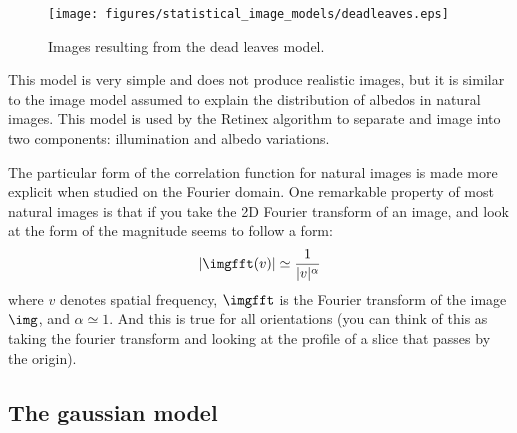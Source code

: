 \begin{figure}[htpb]
  \centerline{
    \texttt{[image: figures/statistical\_image\_models/deadleaves.eps]}
  }
  \caption{Images resulting from the dead leaves model.
  }
  \label{fig:deadleaves}
\end{figure}

This model is very simple and does not produce realistic images, but it is similar to the image model assumed to explain the distribution of albedos in natural images. This model is used by the Retinex algorithm to separate and image into two components: illumination and albedo variations. %

The particular form of the correlation function for natural images is made more explicit when studied on the Fourier domain. One remarkable property of most natural images is that if you take the 2D Fourier transform of an image, and look at the form of the magnitude seems to follow a form:
\begin{equation}
  | \imgfft(v) | \simeq \frac{1}{| v | ^ \alpha}
\end{equation}
where $v$ denotes spatial frequency, $\imgfft$ is the Fourier transform of the image $\img$, and $\alpha \simeq 1$. And this is true for all orientations (you can think of this as taking the fourier transform and looking at the profile of a slice that passes by the origin).



\subsection{The gaussian model}


